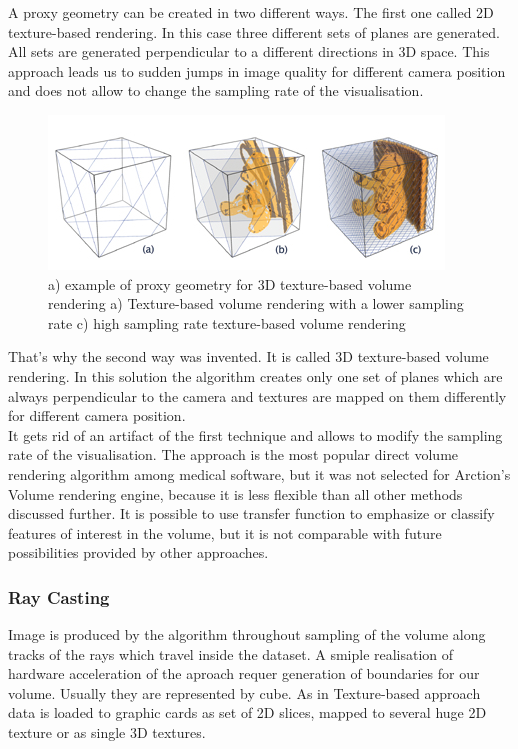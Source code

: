 \documentclass[twoside, english, 11pt]{report}
\begin{document}
A proxy geometry can be created in two different ways. The first one called 2D texture-based rendering. In this case three different sets of planes are generated. All sets are generated perpendicular to a different directions in 3D space. This approach leads us to sudden jumps in image quality for different camera position and does not allow to change the sampling rate of the visualisation.\\
\begin{figure}[H]
\centerline{
\includegraphics[scale=0.7]{img/texture-based}
}
\caption{a) example of proxy geometry for 3D texture-based volume rendering a) Texture-based volume rendering with a lower sampling rate c) high sampling rate texture-based volume rendering}
\end{figure}
That's why the second way was invented. It is called 3D texture-based volume rendering. In this solution the algorithm creates only one set of planes which are always perpendicular to the camera and textures are mapped on them differently for different camera position. \\

It gets rid of an artifact of the first technique and allows to modify the sampling rate of the visualisation. The approach is the most popular direct volume rendering algorithm among medical software, but it was not selected for Arction's Volume rendering engine, because it is less flexible than all other methods discussed further. It is possible to use transfer function to emphasize or classify features of interest in the volume, but it is not comparable with future possibilities provided by other approaches.

\subsubsection{Ray Casting}

Image is produced by the algorithm throughout sampling of the volume along tracks of the rays which travel inside the dataset. A smiple realisation of hardware acceleration of the aproach requer generation of boundaries for our volume. Usually they are represented by cube. As in Texture-based approach data is loaded to graphic cards as set of 2D slices, mapped to several huge 2D texture or as single 3D textures.\\
\end{document}
